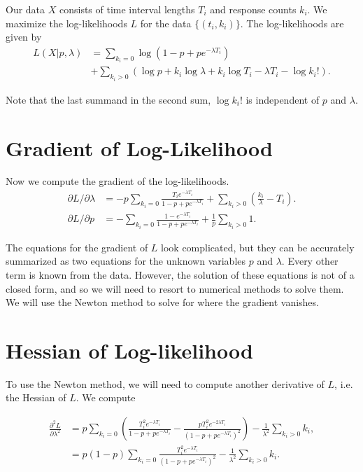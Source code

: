 \documentclass{article}
\newcommand{\pRun}{p}
\newcommand{\expTermi}{e^{- \lambda T_i}}
\newcommand{\commonDenom}{1 - \pRun + \pRun \expTermi}
\begin{document}
Our data \(X\) consists of time interval lengths \(T_i\) and response counts \(k_i\).
We maximize the log-likelihoods \(L\) for the data \(\{(t_i, k_i)\}\). 
The log-likelihoods are given by 
\begin{align}
L(X | \pRun, \lambda) & = \sum\limits_{k_i = 0} \log(1 - \pRun + \pRun \expTermi) \\
& + \sum\limits_{k_i > 0} \left( \log \pRun + k_i \log \lambda + k_i \log T_i
- \lambda T_i - \log k_i! \right). 
\end{align}

Note that the last summand in the second sum, \(\log k_i !\) is independent of \(\pRun\) and \(\lambda\).

\section{Gradient of Log-Likelihood}

Now we compute the gradient of the log-likelihoods.
\begin{align}
\partial L / \partial \lambda & = -\pRun \sum\limits_{k_i = 0} \frac{T_i \expTermi}{\commonDenom}
    + \sum\limits_{k_i > 0} \left( \frac{k_i}{\lambda} - T_i\right). \\
\partial L / \partial \pRun & =  - \sum\limits_{k_i = 0} \frac{1 - \expTermi}{\commonDenom} + \frac{1}{\pRun}\sum\limits_{k_i > 0} 1. 
\end{align}

The equations for the gradient of \(L\) look complicated, but they can be accurately summarized as two equations for the unknown variables \(\pRun\) and \(\lambda\).
Every other term is known from the data. 
However, the solution of these equations is not of a closed form, and so we will need to resort to numerical methods to solve them. 
We will use the Newton method to solve for where the gradient vanishes. 

\section{Hessian of Log-likelihood}

To use the Newton method, we will need to compute another derivative of \(L\), i.e. the Hessian of \(L\).
We compute

\begin{align}
\frac{\partial^2 L} {\partial \lambda^2} & = \pRun \sum\limits_{k_i = 0} \left(\frac{T_i^2 \expTermi}{\commonDenom} 
- \frac{\pRun T_i^2 e^{-2\lambda T_i}}{\left(\commonDenom\right)^2}\right) - \frac{1}{\lambda^2}\sum\limits_{k_i > 0} k_i, \\
& = \pRun(1 - \pRun) \sum\limits_{k_i = 0} \frac{T_i^2 \expTermi}{\left(\commonDenom\right)^2} - \frac{1}{\lambda^2} \sum\limits_{k_i > 0} k_i. 
\end{align}
\end{document}
